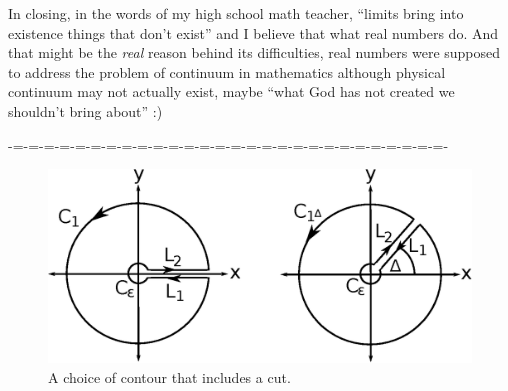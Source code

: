 \documentclass[aps,preprint,preprintnumbers,nofootinbib,showpacs,prd]{revtex4-1}
\begin{document}
In closing, in the words of my high school math teacher, ``limits bring into existence things that don't exist'' and I believe that what real numbers do. And that might be the {\it real} reason behind its difficulties, real numbers were supposed to address the problem of continuum in mathematics although physical continuum may not actually exist, maybe ``what God has not created we shouldn't bring about'' :)

-=-=-=-=-=-=-=-=-=-=-=-=-=-=-=-=-=-=-=-=-=-=-=-=-=-=-=-=-
%
\begin{figure}
\begin{center}
  \includegraphics[scale=0.8]{branch-cut-plots/sq-root-cut.eps}
\end{center}
  \caption{\label{fig:sq-root-cut}
A choice of contour that includes a cut.}
\end{figure}
%
\end{document}
